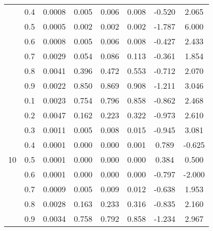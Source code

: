 \documentclass[11pt,a4paper]{report}
\begin{document}
\begin{longtable}{ | c | c || c | c | c | c | c | c | }
 & 0.4 & 0.0008 & 0.005 & 0.006 & 0.008 & -0.520 & 2.065 \\
 & 0.5 & 0.0005 & 0.002 & 0.002 & 0.002 & -1.787 & 6.000 \\
 & 0.6 & 0.0008 & 0.005 & 0.006 & 0.008 & -0.427 & 2.433 \\
 & 0.7 & 0.0029 & 0.054 & 0.086 & 0.113 & -0.361 & 1.854 \\
 & 0.8 & 0.0041 & 0.396 & 0.472 & 0.553 & -0.712 & 2.070 \\
 & 0.9 & 0.0022 & 0.850 & 0.869 & 0.908 & -1.211 & 3.046 \\
 \hline
\multirow{9}{*}{10} & 0.1 & 0.0023 & 0.754 & 0.796 & 0.858 & -0.862 & 2.468 \\
 & 0.2 & 0.0047 & 0.162 & 0.223 & 0.322 & -0.973 & 2.610 \\
 & 0.3 & 0.0011 & 0.005 & 0.008 & 0.015 & -0.945 & 3.081 \\
 & 0.4 & 0.0001 & 0.000 & 0.000 & 0.001 & 0.789 & -0.625 \\
 & 0.5 & 0.0001 & 0.000 & 0.000 & 0.000 & 0.384 & 0.500 \\
 & 0.6 & 0.0001 & 0.000 & 0.000 & 0.000 & -0.797 & -2.000 \\
 & 0.7 & 0.0009 & 0.005 & 0.009 & 0.012 & -0.638 & 1.953 \\
 & 0.8 & 0.0028 & 0.163 & 0.233 & 0.316 & -0.835 & 2.160 \\
 & 0.9 & 0.0034 & 0.758 & 0.792 & 0.858 & -1.234 & 2.967 \\
 \hline
\hline
\end{longtable}
\end{document}
